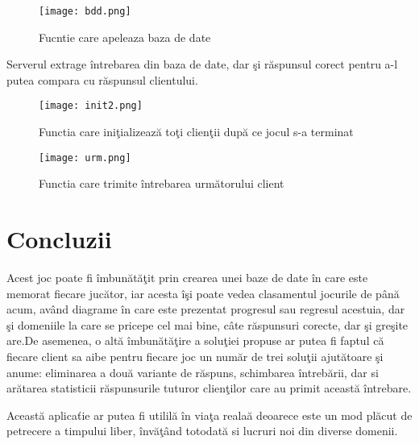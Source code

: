 \documentclass[11pt,leqno, runningheads]{llncs}
\begin{document}
\begin{figure}[!h]
  \texttt{[image: bdd.png]}
  \centering
  \caption{Fucntie care apeleaza baza de date}
\end{figure} 

Serverul extrage \^{i}ntrebarea din baza de date, dar \c si r\u aspunsul corect pentru a-l putea compara cu r\u aspunsul clientului.

\begin{figure}[!h]
  \texttt{[image: init2.png]}
  \centering
  \caption{Functia care ini\c tializeaz\u a to\c ti clien\c tii dup\u a ce jocul s-a terminat}
\end{figure} 


\begin{figure}[!h]
  \texttt{[image: urm.png]}
  \centering
  \caption{Functia care trimite \^{i}ntrebarea urm\u atorului client}
\end{figure} 


\vspace{7cm}
\hspace{3cm}

\newpage
\vspace{2 cm}

\newpage

\vspace{3cm}


\section{Concluzii}

\hspace{1 cm}Acest joc poate fi \^{i}mbun\u at\u a\c tit prin crearea unei baze de date \^{i}n care este memorat fiecare juc\u ator, iar acesta \^{i}\c si poate vedea clasamentul jocurile de p\^{a}n\u a acum, av\^{a}nd diagrame \^{i}n care este prezentat progresul sau regresul acestuia, dar \c si domeniile la care se pricepe cel mai bine, c\^{a}te r\u aspunsuri corecte, dar \c si gre\c site are.De asemenea, o alt\u a \^{i}mbun\u at\u a\c tire a solu\c tiei propuse ar putea fi faptul c\u a fiecare client sa aibe pentru fiecare joc un num\u ar de trei solu\c tii ajut\u atoare \c si anume: eliminarea a dou\u a variante de r\u aspuns, schimbarea \^{i}ntreb\u arii, dar si ar\u atarea statisticii r\u aspunsurile tuturor clien\c tilor care au primit aceast\u a \^{i}ntrebare.


Aceast\u a aplica\v tie ar putea fi utilil\u a \^{i}n via\c ta reala\u a deoarece este un mod pl\u acut de petrecere a timpului liber, \^{i}nv\u a\c t\^{a}nd totodat\u a si lucruri noi din diverse domenii. 
\end{document}
